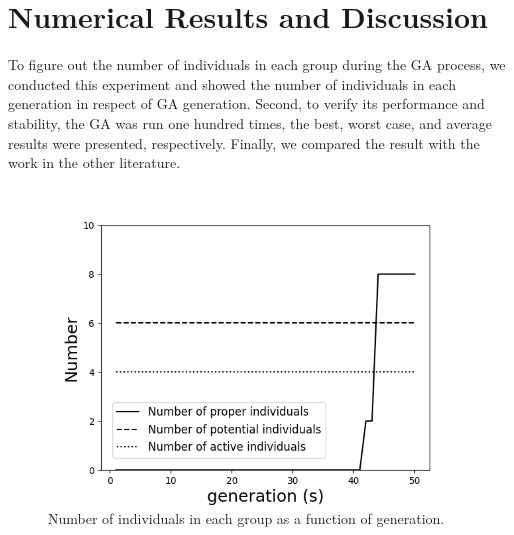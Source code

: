 \section{Numerical Results and Discussion}
To figure out the number of individuals in each group during the GA process, we conducted this experiment
and showed the number of individuals in each generation in respect of GA generation. Second, to verify its performance
and stability, the GA was run one hundred times, the best, worst case, and average
results were presented, respectively. Finally, we compared the result with the work in the
other literature.

\begin{figure}[!htb]
	\centering
	\includegraphics[width=\linewidth]{fig/group_number.png}
	\caption{Number of individuals in each group as a function of generation.}
	\label{fig:group}
\end{figure}


